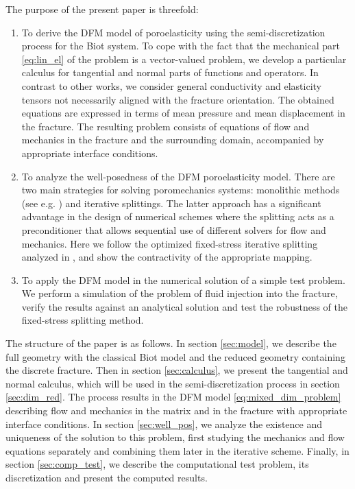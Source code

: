 \documentclass[a4paper]{article}
\numberwithin{equation}{section}
\begin{document}
The purpose of the present paper is threefold:
\begin{enumerate}
    \item To derive the DFM model of poroelasticity using the semi-discretization process for the Biot system.
To cope with the fact that the mechanical part \eqref{eq:lin_el} of the problem is a vector-valued problem, we develop a particular calculus for tangential and normal parts of functions and operators.
In contrast to other works, we consider general conductivity and elasticity tensors not necessarily aligned with the fracture orientation.
The obtained equations are expressed in terms of mean pressure and mean displacement in the fracture.
The resulting problem consists of equations of flow and mechanics in the fracture and the surrounding domain, accompanied by appropriate interface conditions.

    \item To analyze the well-posedness of the DFM poroelasticity model.
There are two main strategies for solving poromechanics systems: monolithic methods (see e.g. \cite{showalter2000diffusion,zenisek1984existence}) and iterative splittings.
The latter approach has a significant advantage in the design of numerical schemes where the splitting acts as a preconditioner \cite{white2016block} that allows sequential use of different solvers for flow and mechanics.
Here we follow the optimized fixed-stress iterative splitting analyzed in \cite{mikelic2013convergence}, and show the contractivity of the appropriate mapping.%

    \item To apply the DFM model in the numerical solution of a simple test problem.
We perform a simulation of the problem of fluid injection into the fracture, verify the results against an analytical solution and test the robustness of the fixed-stress splitting method.
\end{enumerate}

The structure of the paper is as follows.
In section \ref{sec:model}, we describe the full geometry with the classical Biot model and the reduced geometry containing the discrete fracture.
Then in section \ref{sec:calculus}, we present the tangential and normal calculus, which will be used in the semi-discretization process in section \ref{sec:dim_red}.
The process results in the DFM model \eqref{eq:mixed_dim_problem} describing  flow and mechanics in the matrix and in the fracture with appropriate interface conditions.
In section \ref{sec:well_pos}, we analyze the existence and uniqueness of the solution to this problem, first studying the mechanics and flow equations separately and combining them later in the iterative scheme.
Finally, in section \ref{sec:comp_test}, we describe the computational test problem, its discretization and present the computed results.
\end{document}
